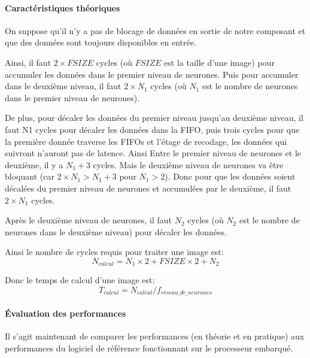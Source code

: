 \paragraph{Caractéristiques théoriques\\}

On suppose qu'il n'y a pas de blocage de données en sortie de notre
composant et que des données sont toujours disponibles en entrée.

Ainsi, il faut $2\times FSIZE$ cycles (où $FSIZE$ est la taille d'une image)
pour accumuler les données dans le premier
niveau de neurones. Puis pour accumuler dans le deuxième niveau, il faut
$2\times N_1$ cycles (où $N_1$ est le nombre de neurones dans le premier niveau de
neurones).

De plus, pour décaler les données du premier niveau jusqu'au deuxième
niveau, il faut N1 cycles pour décaler les données dans la FIFO, puis trois cycles
pour que la première donnée traverse les FIFOs et l'étage de recodage, les données
qui suivront n'auront pas de latence. Ainsi Entre le premier niveau de neurones
et le deuxième, il y a $N_1 + 3$ cycles.
Mais le deuxième niveau de neurones va être bloquant (car $2\times N_1 > N_1 +3$
pour $N_1 > 2$). Donc pour que les données soient décalées du premier
niveau de neurones et accumulées par le deuxième, il faut $2\times N_1$ cycles.

Après le deuxième niveau de neurones, il faut $N_2$ cycles (où $N_2$
est le nombre de neurones dans le deuxième niveau) pour décaler les données.

Ainsi le nombre de cycles requis pour traiter une image est:
\begin{equation}
	N_{calcul} = N_1 \times 2 + FSIZE \times 2 + N_2
\end{equation}

Donc le temps de calcul d'une image est:
\begin{equation}
	T_{calcul} = N_{calcul}/f_{réseau\_de\_neurones} 
\end{equation}


\paragraph{\'{E}valuation des performances\\}

Il s'agit maintenant de comparer les performances (en théorie et en pratique)
aux performances du logiciel de référence fonctionnant sur le processeur embarqué.\\


